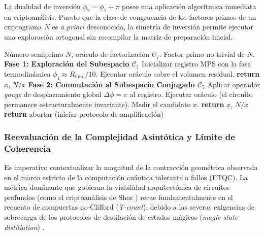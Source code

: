 \documentclass[12pt,a4paper]{article}
\theoremstyle{plain}
\theoremstyle{definition}
\theoremstyle{remark}
\begin{document}
La dualidad de inversión $\phi_2 = \phi_1 + \pi$ posee una aplicación algorítmica inmediata en criptoanálisis. Puesto que la clase de congruencia de los factores primos de un criptograma $N$ es \textit{a priori} desconocida, la simetría de inversión permite ejecutar una exploración ortogonal sin recompilar la matriz de preparación inicial.

\begin{algorithm}[H]
\caption{Estrategia Adaptativa de Búsqueda Modular (MST)}
\label{alg:estrategia}
\begin{algorithmic}[1]
\Require Número semiprimo $N$, oráculo de factorización $U_f$.
\Ensure Factor primo no trivial de $N$.
\Statex
\State \textbf{Fase 1: Exploración del Subespacio $\mathcal{C}_1$}
\State Inicializar registro MPS con la fase termodinámica $\phi_1 \approx R_{\text{fund}}/10$.
\State Ejecutar oráculo sobre el volumen residual.
    \State \textbf{return} $x$, $N/x$
\EndIf
\Statex
\State \textbf{Fase 2: Conmutación al Subespacio Conjugado $\mathcal{C}_5$}
\State Aplicar operador \textit{gauge} de desplazamiento global $\Delta\phi = \pi$ al registro.
\State Ejecutar oráculo (el circuito permanece estructuralmente invariante).
\State Medir el candidato $x$.
    \State \textbf{return} $x$, $N/x$
\Else
    \State \textbf{return} abortar (iniciar protocolo de amplificación)
\EndIf
\end{algorithmic}
\end{algorithm}

\subsubsection*{Reevaluación de la Complejidad Asintótica y Límite de Coherencia}

Es imperativo contextualizar la magnitud de la contracción geométrica observada en el marco estricto de la computación cuántica tolerante a fallos (FTQC). La métrica dominante que gobierna la viabilidad arquitectónica de circuitos profundos (como el criptoanálisis de Shor \cite{Shor1994}) recae fundamentalmente en el recuento de compuertas no-Clifford (\textit{T-count}), debido a las severas exigencias de sobrecarga de los protocolos de destilación de estados mágicos (\textit{magic state distillation}) \cite{Gidney2021}.
\end{document}
